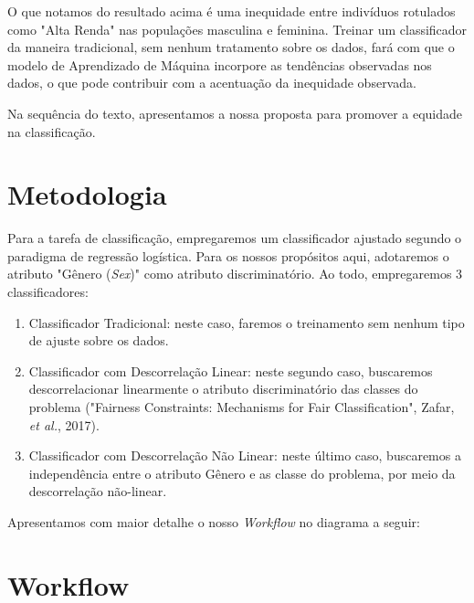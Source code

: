 \documentclass[11pt]{article}
\begin{document}
    O que notamos do resultado acima é uma inequidade entre indivíduos
rotulados como "Alta Renda" nas populações masculina e feminina. Treinar
um classificador da maneira tradicional, sem nenhum tratamento sobre os
dados, fará com que o modelo de Aprendizado de Máquina incorpore as
tendências observadas nos dados, o que pode contribuir com a acentuação
da inequidade observada.

Na sequência do texto, apresentamos a nossa proposta para promover a
equidade na classificação.

    \section{Metodologia}\label{metodologia}

Para a tarefa de classificação, empregaremos um classificador ajustado
segundo o paradigma de regressão logística. Para os nossos propósitos
aqui, adotaremos o atributo "Gênero (\emph{Sex})" como atributo
discriminatório. Ao todo, empregaremos 3 classificadores:

\begin{enumerate}
\def\labelenumi{\arabic{enumi})}
\item
  Classificador Tradicional: neste caso, faremos o treinamento sem
  nenhum tipo de ajuste sobre os dados.
\item
  Classificador com Descorrelação Linear: neste segundo caso, buscaremos
  descorrelacionar linearmente o atributo discriminatório das classes do
  problema ("Fairness Constraints: Mechanisms for Fair Classification",
  Zafar, \emph{et al.}, 2017).
\item
  Classificador com Descorrelação Não Linear: neste último caso,
  buscaremos a independência entre o atributo Gênero e as classe do
  problema, por meio da descorrelação não-linear.
\end{enumerate}

Apresentamos com maior detalhe o nosso \emph{Workflow} no diagrama a
seguir:

    \section{Workflow}\label{workflow}
\end{document}
